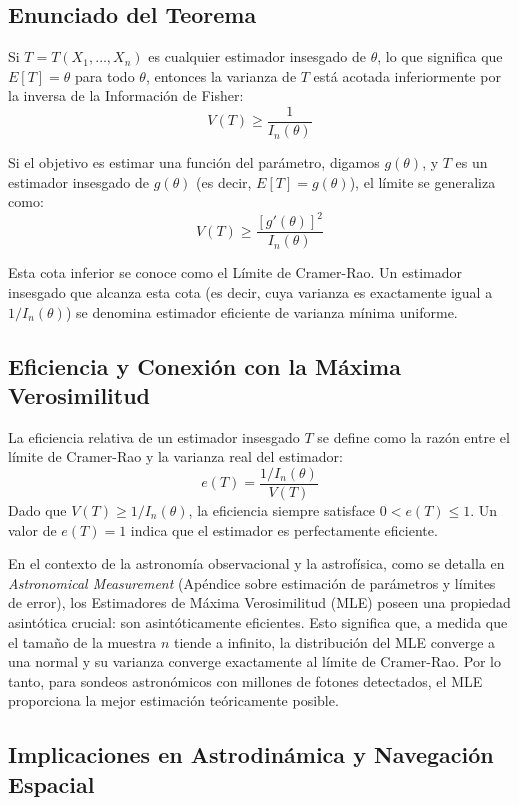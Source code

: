 \subsection{Enunciado del Teorema}

Si $T = T(X_1, \dots, X_n)$ es cualquier estimador insesgado de $\theta$, lo que significa que $E[T] = \theta$ para todo $\theta$, entonces la varianza de $T$ está acotada inferiormente por la inversa de la Información de Fisher:
$$ V(T) \ge \frac{1}{I_n(\theta)} $$

Si el objetivo es estimar una función del parámetro, digamos $g(\theta)$, y $T$ es un estimador insesgado de $g(\theta)$ (es decir, $E[T] = g(\theta)$), el límite se generaliza como:
$$ V(T) \ge \frac{[g'(\theta)]^2}{I_n(\theta)} $$

Esta cota inferior se conoce como el Límite de Cramer-Rao. Un estimador insesgado que alcanza esta cota (es decir, cuya varianza es exactamente igual a $1/I_n(\theta)$) se denomina estimador eficiente de varianza mínima uniforme.

\subsection{Eficiencia y Conexión con la Máxima Verosimilitud}

La eficiencia relativa de un estimador insesgado $T$ se define como la razón entre el límite de Cramer-Rao y la varianza real del estimador:
$$ e(T) = \frac{1 / I_n(\theta)}{V(T)} $$
Dado que $V(T) \ge 1 / I_n(\theta)$, la eficiencia siempre satisface $0 < e(T) \le 1$. Un valor de $e(T) = 1$ indica que el estimador es perfectamente eficiente.

En el contexto de la astronomía observacional y la astrofísica, como se detalla en \textit{Astronomical Measurement} (Apéndice sobre estimación de parámetros y límites de error), los Estimadores de Máxima Verosimilitud (MLE) poseen una propiedad asintótica crucial: son asintóticamente eficientes. Esto significa que, a medida que el tamaño de la muestra $n$ tiende a infinito, la distribución del MLE converge a una normal y su varianza converge exactamente al límite de Cramer-Rao. Por lo tanto, para sondeos astronómicos con millones de fotones detectados, el MLE proporciona la mejor estimación teóricamente posible.

\subsection{Implicaciones en Astrodinámica y Navegación Espacial}

